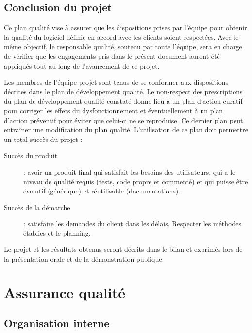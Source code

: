 \documentclass[10pt,a4paper]{article}
\begin{document}
\subsection{Conclusion du projet}

Ce plan qualité vise à assurer que les dispositions prises par l’équipe pour obtenir la qualité du logiciel définie en accord avec les clients soient respectées. Avec le même objectif, le responsable qualité, soutenu par toute l’équipe, sera en charge de vérifier que les engagements pris dans le présent document auront été appliqués tout au long de l'avancement de ce projet.

Les membres de l'équipe projet sont tenus de se conformer aux dispositions décrites dans le plan de développement qualité. Le non-respect des prescriptions du plan de développement qualité constaté donne lieu à un plan d'action curatif pour corriger les effets du dysfonctionnement et éventuellement à un plan d'action préventif pour éviter que celui-ci ne se reproduise. Ce dernier plan peut entraîner une modification du plan qualité. L’utilisation de ce plan doit permettre un total succès du projet :

\begin{description}
\item [Succès du produit] : avoir un produit final qui satisfait les besoins des utilisateurs, qui a le niveau de qualité requis (tests, code propre et commenté) et qui puisse être évolutif (générique) et réutilisable (documentations).
\item [Succès de la démarche] : satisfaire les demandes du client dans les délais. Respecter les méthodes établies et le planning.
\end{description}

Le projet et les résultats obtenus seront décrits dans le bilan et exprimés lors de la présentation orale et de la démonstration publique. 


\newpage
\section{Assurance qualité}

\subsection{Organisation interne}
\end{document}
